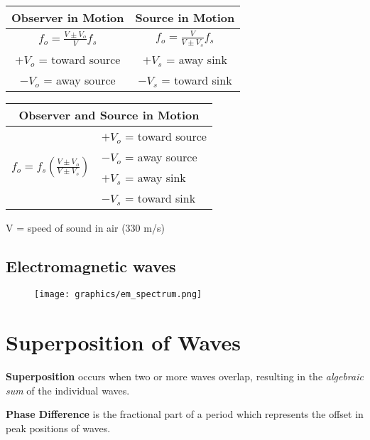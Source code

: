 \documentclass[12pt,a4paper]{article}
\begin{document}
\begin{center}
\begin{tabular}{ |c|c| } 
 \hline
 \textbf{Observer in Motion} & \textbf{Source in Motion}  \\ 
\hline
 $f_o = \frac{V \pm V_o}{V}f_s$ & $f_o = \frac{V}{V \pm V_s}f_s$  \\ 
\hline
 \textbf{$+ V_o$} = toward source & \textbf{$+ V_s$} = away sink  \\ 
 \textbf{$- V_o$} = away source & \textbf{$- V_s$} = toward sink  \\
 \hline
\end{tabular}
\end{center}

\begin{center}
\begin{tabular}{ | l | l | } 
 \hline
 \multicolumn{2}{|c|}{\textbf{Observer and Source in Motion}}\\
 \hline
\hline
\multirow{4}{7em}{$f_o = f_s(\frac{V \pm V_o}{V \pm V_s})$} & \textbf{$+ V_o$} = toward source \\ 
& \textbf{$- V_o$} = away source \\
& \textbf{$+ V_s$} = away sink \\ 
& \textbf{$- V_s$} = toward sink \\ 
\hline
\end{tabular}
\end{center}

\noindent V = speed of sound in air (330 m/s)

\subsection{Electromagnetic waves}

\begin{figure}[h]
\texttt{[image: graphics/em\_spectrum.png]}
\centering
\end{figure}

\newpage
\section{Superposition of Waves}
\noindent
\textbf{Superposition} occurs when two or more waves overlap, resulting in the \textit{algebraic sum} of the individual waves.

\bigskip \noindent
\textbf{Phase Difference} is the fractional part of a period which represents the offset in peak positions of waves.
\end{document}
